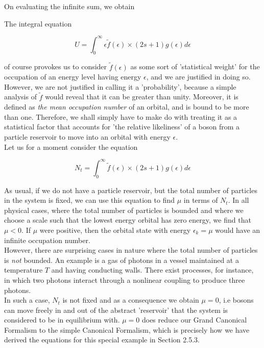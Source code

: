 \documentclass[oneside]{book}
\begin{document}
On evaluating the infinite sum, we obtain

\begin{center}
\end{center}

The integral equation

\[  U =  \int_{0}^{\infty}\epsilon \tilde f(\epsilon) \times (2s+1)g(\epsilon)d\epsilon \]

of course provokes us to consider $\tilde f(\epsilon)$ as some sort of 'statistical weight' for the occupation of an energy level having energy $\epsilon$, and we are justified in doing so.\\

However, we are not justified in calling it a 'probability', because a simple analysis of $\tilde f$ would reveal that it can be greater than unity. Moreover, it is defined as \emph{the mean occupation number} of an orbital, and is bound to be more than one. Therefore, we shall simply have to make do with treating it as a statistical factor that accounts for 'the relative likeliness' of a boson from a particle reservoir to move into an orbital with energy $\epsilon$.\\


Let us for a moment consider the equation

\[  N_t =  \int_{0}^{\infty}\tilde f(\epsilon) \times (2s+1)g(\epsilon)d\epsilon \]

As usual, if we do not have a particle reservoir, but the total number of particles in the system is fixed, we can use this equation to find $\mu$ in terms of $N_t$. In all physical cases, where the total number of particles is bounded and where we choose a scale such that the lowest energy orbital has zero energy, we find that $\mu < 0$. If $\mu$ were positive, then the orbital state with energy $\epsilon_k = \mu$ would have an infinite occupation number.\\

However, there are surprising cases in nature where the total number of particles is \emph{not} bounded. An example is a gas of photons in a vessel maintained at a temperature $T$ and having conducting walls. There exist processes, for instance, in which two photons interact through a nonlinear coupling to produce three photons.\\

In such a case, $N_t$ is not fixed and as a consequence we obtain $\mu = 0$, i.e bosons can move freely in and out of the abstract 'reservoir' that the system is considered to be in equilibrium with. $\mu = 0$ does reduce our Grand Canonical Formalism to the simple Canonical Formalism, which is precisely how we have derived the equations for this special example in Section 2.5.3. \\
\end{document}
